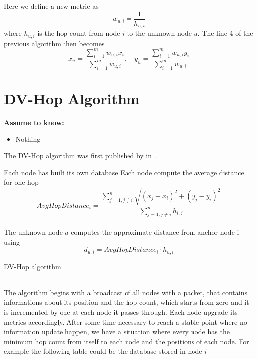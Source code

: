 \documentclass[12pt,twoside]{report}
\begin{document}
Here we define a new metric as 
\begin{equation}
    w_{u,i}=\frac{1}{h_{u,i}}
\end{equation}
where $h_{u,i}$ is the hop count from node $i$ to the unknown node $u$. The line 4 of the previous algorithm then becomes
\begin{equation}
     x_u=\frac{\sum_{i=1}^mw_{u,i}x_i}{\sum_{i=1}^mw_{u,i}},\quad y_u=\frac{\sum_{i=1}^mw_{u,i}y_i}{\sum_{i=1}^mw_{u,i}}
\end{equation}








\clearpage

\section{DV-Hop Algorithm}
  \begin{center}
  \textbf{Assume to know:}
  \begin{itemize}
    \centering
    \item Nothing
  \end{itemize}
  \end{center}
The DV-Hop algorithm was first published by in \cite{965964}.\\
\begin{algorithm}[H]
\SetAlgoLined
{}
Each node has built its own database\;
Each node compute the average distance for one hop
\begin{equation}
    AvgHopDistance_i=\frac{\sum_{j=1,j\neq i}^n\sqrt{(x_j-x_i)^2+(y_j-y_i)^2}}{\sum_{j=1,j\neq i}^nh_{i,j}}
\end{equation}\\
The unknown node $u$ computes the approximate distance from anchor node i using 
\begin{equation}
    d_{u,i}=AvgHopDistance_i \cdot h_{u,i}
    \label{eq:19}
\end{equation}
 \caption{DV-Hop algorithm}
\end{algorithm}
\noindent\\
The algorithm begins with a broadcast of all nodes with a packet, that contains informations about its position and the hop count, which starts from zero and it is incremented by one at each node it passes through. Each node upgrade its metrics accordingly. After some time necessary to reach a stable point where no information update happen, we have a situation where every node has the minimum hop count from itself to each node and the positions of each node. For example the following table could be the database stored in node $i$
\end{document}
